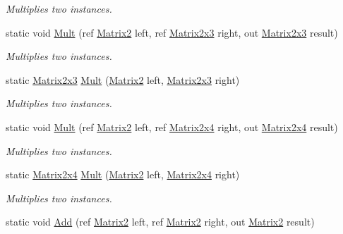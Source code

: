 \begin{DoxyCompactItemize}
\begin{DoxyCompactList}\small\item\em Multiplies two instances. \end{DoxyCompactList}\item 
static void \hyperlink{struct_open_t_k_1_1_matrix2_a304755f88a224959c21e6dc285804dcf}{Mult} (ref \hyperlink{struct_open_t_k_1_1_matrix2}{Matrix2} left, ref \hyperlink{struct_open_t_k_1_1_matrix2x3}{Matrix2x3} right, out \hyperlink{struct_open_t_k_1_1_matrix2x3}{Matrix2x3} result)
\begin{DoxyCompactList}\small\item\em Multiplies two instances. \end{DoxyCompactList}\item 
static \hyperlink{struct_open_t_k_1_1_matrix2x3}{Matrix2x3} \hyperlink{struct_open_t_k_1_1_matrix2_a21f3f53d36b4ebe4fc2b64cacf8befdd}{Mult} (\hyperlink{struct_open_t_k_1_1_matrix2}{Matrix2} left, \hyperlink{struct_open_t_k_1_1_matrix2x3}{Matrix2x3} right)
\begin{DoxyCompactList}\small\item\em Multiplies two instances. \end{DoxyCompactList}\item 
static void \hyperlink{struct_open_t_k_1_1_matrix2_ad8b9cad7dd846e35407ad7703c51858f}{Mult} (ref \hyperlink{struct_open_t_k_1_1_matrix2}{Matrix2} left, ref \hyperlink{struct_open_t_k_1_1_matrix2x4}{Matrix2x4} right, out \hyperlink{struct_open_t_k_1_1_matrix2x4}{Matrix2x4} result)
\begin{DoxyCompactList}\small\item\em Multiplies two instances. \end{DoxyCompactList}\item 
static \hyperlink{struct_open_t_k_1_1_matrix2x4}{Matrix2x4} \hyperlink{struct_open_t_k_1_1_matrix2_a1a940320cc553176b4c15e29f4b7f6d3}{Mult} (\hyperlink{struct_open_t_k_1_1_matrix2}{Matrix2} left, \hyperlink{struct_open_t_k_1_1_matrix2x4}{Matrix2x4} right)
\begin{DoxyCompactList}\small\item\em Multiplies two instances. \end{DoxyCompactList}\item 
static void \hyperlink{struct_open_t_k_1_1_matrix2_a7892558f78f7d73ae838e78c8e355543}{Add} (ref \hyperlink{struct_open_t_k_1_1_matrix2}{Matrix2} left, ref \hyperlink{struct_open_t_k_1_1_matrix2}{Matrix2} right, out \hyperlink{struct_open_t_k_1_1_matrix2}{Matrix2} result)

\end{DoxyCompactItemize}
